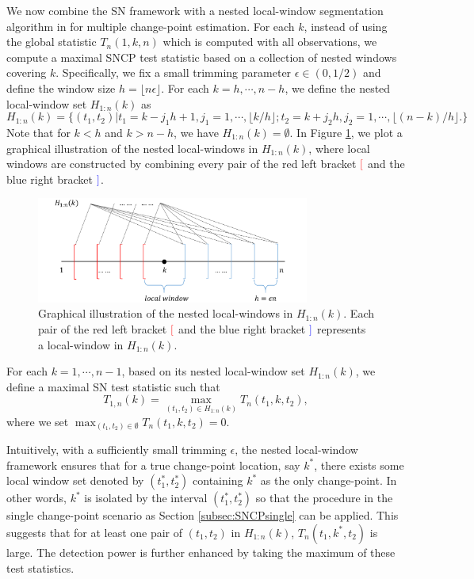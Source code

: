 We now combine the SN framework with a nested local-window segmentation algorithm in \cite{zhao2021segmenting} for multiple change-point estimation.  For each $k$, instead of using the global statistic  $T_n(1,k,n)$ which is computed with all observations, we compute a maximal SNCP test statistic based on a collection of nested windows covering $k$. Specifically, we fix a small trimming parameter $\epsilon \in (0,1/2)$ and define the window size $h=\lfloor{n\epsilon}\rfloor$. For each $k=h,\cdots,n-h$, we define the nested local-window set $H_{1:n}(k)$ as
\begin{equation}\label{window_set}
	H_{1:n}(k) = \{ (t_1,t_2)|t_1=k-j_1h+1,j_1=1,\cdots,\lfloor{k/h}\rfloor;t_2=k+j_2h,j_2=1,\cdots,\lfloor{(n-k)/h}\rfloor. \}
\end{equation}
Note that for $k<h$ and $k>n-h$, we have $H_{1:n}(k)=\emptyset$. In Figure \ref{fig:local_window}, we plot a graphical illustration of the nested local-windows in $H_{1:n}(k)$, where local windows are constructed by combining  every pair of the red left bracket ${\color{red}[}$ and the blue right bracket ${\color{blue}]}$. 
\begin{figure}[H]
	\centering
	\includegraphics[width=0.8\textwidth]{local_window.png}
	\caption{Graphical illustration of the nested local-windows in $H_{1:n}(k)$. Each pair of the red left bracket ${\color{red}[}$ and the blue right bracket ${\color{blue}]}$ represents a local-window in $H_{1:n}(k)$. }
	\label{fig:local_window}
\end{figure}



For each $k=1,\cdots,n-1$, based on its nested local-window set $H_{1:n}(k)$, we define a maximal SN test statistic such that 
\begin{equation}\label{max_T}
	T_{1,n}(k) = \max_{(t_1,t_2) \in H_{1:n}(k)} T_n(t_1,k,t_2),
\end{equation}
where we set $\max_{(t_1,t_2) \in \emptyset} T_n(t_1,k,t_2) = 0$. 

Intuitively, with a sufficiently small trimming $\epsilon$, the nested local-window framework ensures that for a true change-point location, say $k^*$,  there exists some local window set denoted by $(t_1^*,t_2^*)$ containing $k^*$ as the only change-point. In other words, $k^*$ is isolated by the interval $(t_1^*,t_2^*)$ so that the procedure in the single change-point scenario as Section \ref{subsec:SNCPsingle} can be applied. This suggests that for at least one pair of $(t_1,t_2)$ in $H_{1:n}(k)$, $T_n(t_1,k^*,t_2)$ is large. The detection power is further enhanced by taking the maximum of these test statistics.

